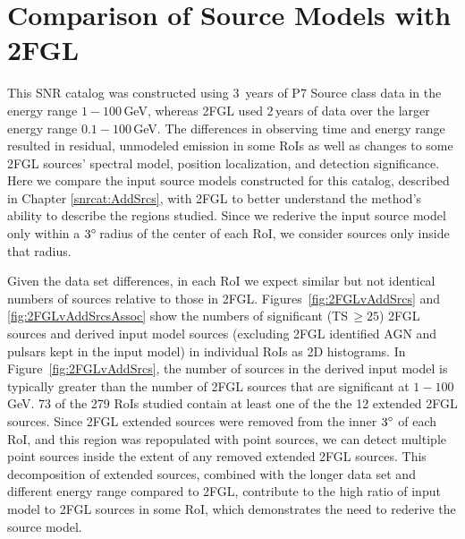 
\section{Comparison of Source Models with 2FGL}
\label{snrcat:addSrcs2FGL}

This SNR catalog was constructed using $3$~years of P7 Source class data in the energy range $1-100$\,GeV, whereas 2FGL used $2$\,years of data over the larger energy range $0.1-100$\,GeV. The differences in observing time and energy range resulted in residual, unmodeled emission in some RoIs as well as changes to some 2FGL sources' spectral model, position localization, and detection significance. Here we compare the input source models constructed for this catalog, described in Chapter \ref{snrcat:AddSrcs}, with 2FGL to better understand the \srcs{} method's ability to describe the regions studied. Since we rederive the input source model only within a $3\mbox{$^\circ$}$\,radius of the center of each RoI, we consider sources only inside that radius.

Given the data set differences, in each RoI we expect similar but not identical numbers of sources relative to those in 2FGL.
Figures~\ref{fig:2FGLvAddSrcs} and \ref{fig:2FGLvAddSrcsAssoc} show the numbers of significant (TS\,$\geq 25$) 2FGL sources and derived input model sources (excluding 2FGL identified AGN and pulsars kept in the input model) in individual RoIs as 2D histograms. In Figure~\ref{fig:2FGLvAddSrcs}, the number of sources in the derived input model is typically greater than the number of 2FGL sources that are significant at $1-100$\,GeV. 73 of the 279 RoIs studied contain at least one of the the 12 extended 2FGL sources. Since 2FGL extended sources were removed from the inner $3\mbox{$^\circ$}$ of each RoI, and this region was repopulated with point sources, we can detect multiple point sources inside the extent of any removed extended 2FGL sources. This decomposition of extended sources, combined with the longer data set and different energy range compared to 2FGL, contribute to the high ratio of input model to 2FGL sources in some RoI, which demonstrates the need to rederive the source model. 

